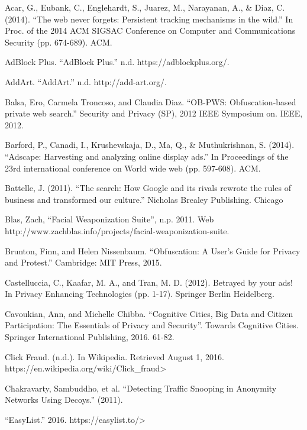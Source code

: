 \documentclass[conference]{IEEEtran}
\begin{document}
\begin{thebibliography}{99}

 Acar, G., Eubank, C., Englehardt, S., Juarez, M., Narayanan, A., \& Diaz, C. (2014). “The web never forgets: Persistent tracking mechanisms in the wild.” In Proc. of the 2014 ACM SIGSAC Conference on Computer and Communications Security (pp. 674-689). ACM.

 AdBlock Plus. “AdBlock Plus.” n.d. https://adblockplus.org/.

 AddArt. “AddArt.” n.d. http://add-art.org/.

 Balsa, Ero, Carmela Troncoso, and Claudia Diaz. “OB-PWS: Obfuscation-based private web search.” Security and Privacy (SP), 2012 IEEE Symposium on. IEEE, 2012.

 Barford, P., Canadi, I., Krushevskaja, D., Ma, Q., \& Muthukrishnan, S. (2014). “Adscape: Harvesting and analyzing online display ads.” In Proceedings of the 23rd international conference on World wide web (pp. 597-608). ACM.

 Battelle, J. (2011). “The search: How Google and its rivals rewrote the rules of business and transformed our culture.” Nicholas Brealey Publishing. Chicago

 Blas, Zach, “Facial Weaponization Suite”, n.p. 2011. Web http://www.zachblas.info/projects/facial-weaponization-suite.

 Brunton, Finn, and Helen Nissenbaum. “Obfuscation: A User's Guide for Privacy and Protest.” Cambridge: MIT Press, 2015.

 Castelluccia, C., Kaafar, M. A., and Tran, M. D. (2012). Betrayed by your ads! In Privacy Enhancing Technologies (pp. 1-17). Springer Berlin Heidelberg.

 Cavoukian, Ann, and Michelle Chibba. “Cognitive Cities, Big Data and Citizen Participation: The Essentials of Privacy and Security”. Towards Cognitive Cities. Springer International Publishing, 2016. 61-82.

 Click Fraud. (n.d.). In Wikipedia. Retrieved August 1, 2016. https://en.wikipedia.org/wiki/Click\_fraud>

 Chakravarty, Sambuddho, et al. “Detecting Traffic Snooping in Anonymity Networks Using Decoys.” (2011).

 “EasyList.” 2016. https://easylist.to/>


\end{thebibliography}
\end{document}
